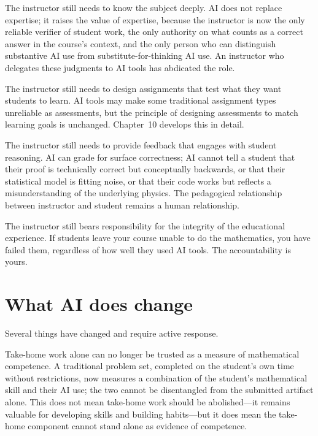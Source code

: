 \documentclass[11pt]{book}
\begin{document}
The instructor still needs to know the subject deeply. AI does not replace expertise; it raises the value of expertise, because the instructor is now the only reliable verifier of student work, the only authority on what counts as a correct answer in the course's context, and the only person who can distinguish substantive AI use from substitute-for-thinking AI use. An instructor who delegates these judgments to AI tools has abdicated the role.

The instructor still needs to design assignments that test what they want students to learn. AI tools may make some traditional assignment types unreliable as assessments, but the principle of designing assessments to match learning goals is unchanged. Chapter~10 develops this in detail.

The instructor still needs to provide feedback that engages with student reasoning. AI can grade for surface correctness; AI cannot tell a student that their proof is technically correct but conceptually backwards, or that their statistical model is fitting noise, or that their code works but reflects a misunderstanding of the underlying physics. The pedagogical relationship between instructor and student remains a human relationship.

The instructor still bears responsibility for the integrity of the educational experience. If students leave your course unable to do the mathematics, you have failed them, regardless of how well they used AI tools. The accountability is yours.

\section{What AI does change}

Several things have changed and require active response.

Take-home work alone can no longer be trusted as a measure of mathematical competence. A traditional problem set, completed on the student's own time without restrictions, now measures a combination of the student's mathematical skill and their AI use; the two cannot be disentangled from the submitted artifact alone. This does not mean take-home work should be abolished---it remains valuable for developing skills and building habits---but it does mean the take-home component cannot stand alone as evidence of competence.
\end{document}
